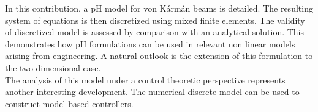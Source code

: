 \documentclass{ifacconf}
\begin{document}
In this contribution, a pH model for von K\'arm\'an beams is detailed. The resulting system of equations is then discretized using mixed finite elements. The validity of discretized model is assessed by comparison with an analytical solution. This demonstrates how pH formulations can be used in relevant non linear models arising from engineering. A natural outlook is the extension of this formulation to the two-dimensional case. \\

The analysis of this model under a control theoretic perspective represents another interesting development. The numerical discrete model can be used to construct model based controllers.


\appendix

      
\end{document}
